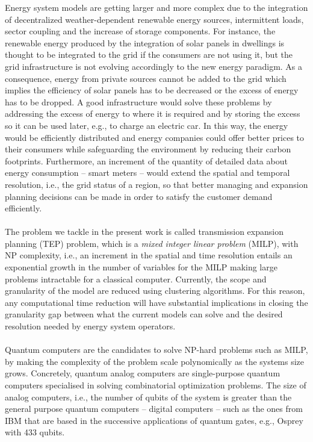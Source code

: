 Energy system models are getting larger and more complex due to the integration of decentralized weather-dependent renewable energy sources, intermittent loads, sector coupling and the increase of storage components. For instance, the renewable energy produced by the integration of solar panels in dwellings is thought to be integrated to the grid if the consumers are not using it, but the grid infrastructure is not evolving accordingly to the new energy paradigm. As a consequence, energy from private sources cannot be added to the grid which implies the efficiency of solar panels has to be decreased or the excess of energy has to be dropped. A good infrastructure would solve these problems by addressing the excess of energy to where it is required and by storing the excess so it can be used later, e.g., to charge an electric car. In this way, the energy would be efficiently distributed and energy companies could offer better prices to their consumers while safeguarding the environment by reducing their carbon footprints. Furthermore, an increment of the quantity of detailed data about energy consumption -- smart meters -- would extend the spatial and temporal resolution, i.e., the grid status of a region, so that better managing and expansion planning decisions can be made in order to satisfy the customer demand efficiently.\\\\ 
The problem we tackle in the present work is called transmission expansion planning (TEP) problem, which is a \textit{mixed integer linear problem} (MILP), with NP complexity, i.e., an increment in the spatial and time resolution entails an exponential growth in the number of variables for the MILP making large problems intractable for a classical computer. Currently, the scope and granularity of the model are reduced using clustering algorithms. For this reason, any computational time reduction will have substantial implications in closing the granularity gap between what the current models can solve and the desired resolution needed by energy system operators.\\\\
Quantum computers are the candidates to solve NP-hard problems such as MILP, by making the complexity of the problem scale polynomically as the systems size grows. Concretely, quantum analog computers are single-purpose quantum computers specialised in solving combinatorial optimization problems. The size of analog computers, i.e., the number of qubits of the system is greater than the general purpose quantum computers -- digital computers -- such as the ones from IBM that are based in the successive applications of quantum gates, e.g., Osprey with 433 qubits.
